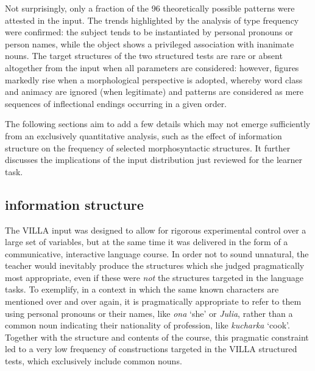 Not surprisingly, only a fraction of the 96 theoretically possible patterns were attested in the input. The trends highlighted by the analysis of type frequency were confirmed: the subject tends to be instantiated by personal pronouns or person names, while the object shows a privileged association with inanimate nouns. The target structures of the two structured tests are rare or absent altogether from the input when all parameters are considered: however, figures markedly rise when a morphological perspective is adopted, whereby word class and animacy are ignored (when legitimate) and patterns are considered as mere sequences of inflectional endings occurring in a given order.

The following sections aim to add a few details which may not emerge sufficiently from an exclusively quantitative analysis, such as the effect of information structure on the frequency of selected morphosyntactic structures. It further discusses the implications of the input distribution just reviewed for the learner task.

\subsection{information structure}\label{sec:08:1.1}

The VILLA input was designed to allow for rigorous experimental control over a large set of variables, but at the same time it was delivered in the form of a communicative, interactive language course. In order not to sound unnatural, the teacher would inevitably produce the structures which she judged pragmatically most appropriate, even if these were \textit{not} the structures targeted in the language tasks. To exemplify, in a context in which the same known characters are mentioned over and over again, it is pragmatically appropriate to refer to them using personal pronouns or their names, like \textit{ona} ‘she’ or \textit{Julia}, rather than a common noun indicating their nationality of profession, like \textit{kucharka} ‘cook’. Together with the structure and contents of the course, this pragmatic constraint led to a very low frequency of constructions targeted in the VILLA structured tests, which exclusively include common nouns.

